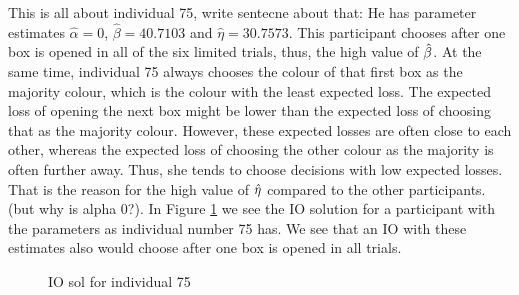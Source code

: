 This is all about individual 75, write sentecne about that:
He has parameter estimates $\hat{\alpha}=0$, $\hat{\beta}=40.7103$ and $\hat{\eta}=30.7573$. This participant chooses after one box is opened in all of the six limited trials, thus, the high value of $\hat{\beta}$. At the same time, individual 75 always chooses the colour of that first box as the majority colour, which is the colour with the least expected loss. The expected loss of opening the next box might be lower than the expected loss of choosing that as the majority colour. However, these expected losses are often close to each other, whereas the expected loss of choosing the other colour as the majority is often further away. Thus, she tends to choose decisions with low expected losses. That is the reason for the high value of $\hat{\eta}$ compared to the other participants. (but why is alpha 0?). In Figure \ref{fig:IO_sol_person_75_lim} we see the IO solution for a participant with the parameters as individual number 75 has. We see that an IO with these estimates also would choose after one box is opened in all trials. 
\begin{figure}
    \centering
    \scalebox{0.8}{}
    \caption[IO solution for individual number 75, limited]{IO sol for individual 75}
    \label{fig:IO_sol_person_75_lim}
\end{figure}

